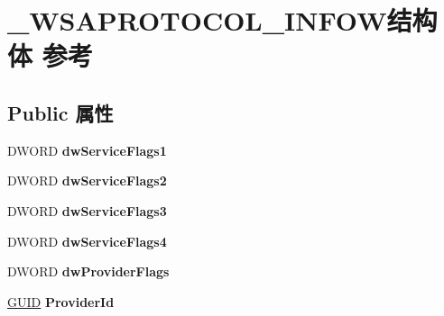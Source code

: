 \hypertarget{struct___w_s_a_p_r_o_t_o_c_o_l___i_n_f_o_w}{}\section{\+\_\+\+W\+S\+A\+P\+R\+O\+T\+O\+C\+O\+L\+\_\+\+I\+N\+F\+O\+W结构体 参考}
\label{struct___w_s_a_p_r_o_t_o_c_o_l___i_n_f_o_w}
\subsection*{Public 属性}
\begin{DoxyCompactItemize}
\item 
\mbox{\label{struct___w_s_a_p_r_o_t_o_c_o_l___i_n_f_o_w_a8e0e65f8a8631fa8305110b563d835e5}} 
D\+W\+O\+RD {\bfseries dw\+Service\+Flags1}
\item 
\mbox{\label{struct___w_s_a_p_r_o_t_o_c_o_l___i_n_f_o_w_a637012a79f0eaa1d8f1e4b0c4ce66574}} 
D\+W\+O\+RD {\bfseries dw\+Service\+Flags2}
\item 
\mbox{\label{struct___w_s_a_p_r_o_t_o_c_o_l___i_n_f_o_w_a0ace4443aedf7b0d4ffee1b148080e8b}} 
D\+W\+O\+RD {\bfseries dw\+Service\+Flags3}
\item 
\mbox{\label{struct___w_s_a_p_r_o_t_o_c_o_l___i_n_f_o_w_a8a698afc5493641b04d569d8ea04482f}} 
D\+W\+O\+RD {\bfseries dw\+Service\+Flags4}
\item 
\mbox{\label{struct___w_s_a_p_r_o_t_o_c_o_l___i_n_f_o_w_a907f1670cbcb3b431993ff587f3798d5}} 
D\+W\+O\+RD {\bfseries dw\+Provider\+Flags}
\item 
\mbox{\label{struct___w_s_a_p_r_o_t_o_c_o_l___i_n_f_o_w_aae9470f26ee0ee9f13c20d1538145021}} 
\hyperlink{interface_g_u_i_d}{G\+U\+ID} {\bfseries Provider\+Id}
\item 
\mbox{\label{struct___w_s_a_p_r_o_t_o_c_o_l___i_n_f_o_w_a63c128eee5e12814c1ddb663c299b4ce}} 

\end{DoxyCompactItemize}
